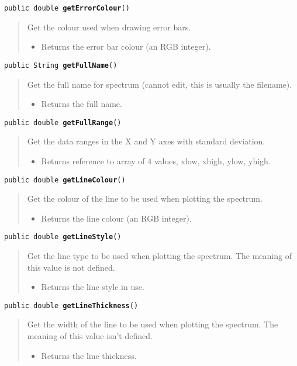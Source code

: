\documentclass[twoside,11pt,nolof]{starlink}
\providecommand{\method}[1]{\texttt{#1}}
\newenvironment{desc}{\begin{quote}}{\end{quote}}
\begin{document}
\method{public double \textbf{getErrorColour}()\label{l51}\label{l52}}
\begin{desc}Get the colour used when drawing error bars.
\begin{itemize}
\item{Returns the error bar colour (an RGB integer). }
\end{itemize}
\end{desc}

\method{public String \textbf{getFullName}()\label{l53}\label{l54}}
\begin{desc}Get the full name for spectrum (cannot edit, this is usually
 the filename).
\begin{itemize}
\item{Returns the full name. }
\end{itemize}
\end{desc}

\method{public double \textbf{getFullRange}()\label{l55}\label{l56}}
\begin{desc}Get the data ranges in the X and Y axes with standard
 deviation.
\begin{itemize}
\item{Returns reference to array of 4 values, xlow, xhigh, ylow, yhigh. }
\end{itemize}
\end{desc}

\method{public double \textbf{getLineColour}()\label{l57}\label{l58}}
\begin{desc}Get the colour of the line to be used when plotting the
 spectrum.
\begin{itemize}
\item{Returns the line colour (an RGB integer). }
\end{itemize}
\end{desc}

\method{public double \textbf{getLineStyle}()\label{l59}\label{l60}}
\begin{desc}Get the line type to be used when plotting the spectrum.
 The meaning of this value is not defined.
\begin{itemize}
\item{Returns the line style in use. }
\end{itemize}
\end{desc}

\method{public double \textbf{getLineThickness}()\label{l61}\label{l62}}
\begin{desc}Get the width of the line to be used when plotting the
 spectrum. The meaning of this value isn't defined.
\begin{itemize}
\item{Returns the line thickness. }
\end{itemize}
\end{desc}
\end{document}
